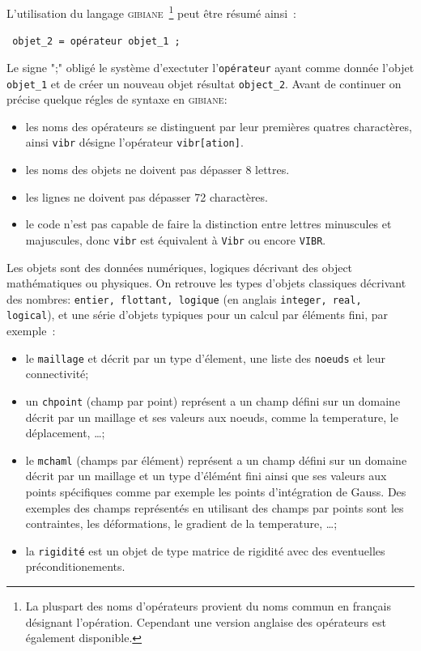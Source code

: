 L'utilisation du langage \textsc{gibiane}~\footnote{La pluspart des noms d'opérateurs provient du 
noms commun en français désignant l'opération. Cependant une version anglaise 
des opérateurs est également disponible.} 
peut être résumé ainsi~: \\
\centerline{\texttt{ objet\_2 = opérateur objet\_1 ; }}
Le signe ";" obligé le  système d'exectuter l'\texttt{opérateur} ayant comme donnée l'objet 
\texttt{objet\_1} et de créer un nouveau objet résultat \texttt{object\_2}. Avant de 
continuer on précise quelque régles de syntaxe en \textsc{gibiane}:
\begin{itemize}
 
 \item les noms des opérateurs se distinguent par leur premières quatres charactères, ainsi
 \texttt{vibr} désigne l'opérateur  \texttt{vibr[ation]}.
   
 \item les noms des objets ne doivent pas dépasser 8 lettres.
 
 \item les lignes ne doivent pas dépasser 72 charactères.
 
 \item le code n'est pas capable de faire la distinction entre lettres minuscules
 et majuscules, donc \texttt{vibr} est équivalent à \texttt{Vibr} ou 
 encore \texttt{VIBR}.      

\end{itemize}
Les objets sont des données numériques, logiques décrivant des object mathématiques 
ou physiques. On retrouve les types d'objets classiques décrivant des nombres:
\texttt{entier, flottant, logique} (en anglais \texttt{integer, real, logical}), 
et une série d'objets typiques pour un calcul par éléments fini, par exemple~:
\begin{itemize}

\item le \texttt{maillage} et décrit par un type d'élement, une liste 
des \texttt{noeuds} et leur connectivité;

\item un \texttt{chpoint} (champ par point) représent a un champ défini sur un domaine 
décrit par un maillage et ses valeurs aux noeuds, comme la temperature, le déplacement, \ldots;

\item le \texttt{mchaml} (champs par élément) représent a un champ défini sur un domaine 
décrit par un maillage et un type d'élémént fini ainsi que ses valeurs aux 
points spécifiques comme par exemple les points d'intégration de Gauss. Des exemples 
des champs représentés en utilisant des champs par points sont 
les contraintes, les déformations, le gradient de la temperature, \ldots;

\item la \texttt{rigidité} est un objet de type matrice de rigidité avec des eventuelles 
préconditionements.

\end{itemize}

